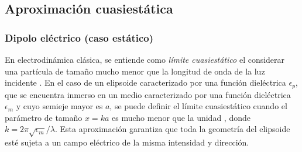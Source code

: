 \subsection{Aproximación cuasiestática}
\subsubsection{Dipolo eléctrico (caso estático)}

En electrodinámica clásica, se entiende como \textit{límite cuasiestático} el considerar una partícula de tamaño mucho menor que la longitud de onda de la luz incidente \cite{Cuasiest}. En el caso de un elipsoide caracterizado por una función dieléctrica $\epsilon_p$, que se encuentra inmerso en un medio caracterizado por una función dieléctrica $\epsilon_m$ y cuyo semieje mayor es $a$, se puede definir el límite cuasiestático cuando el parámetro de tamaño $x=ka$ es mucho menor que la unidad \cite{Bohren}, donde $k=2\pi \sqrt{\epsilon_m}/\lambda$. Esta aproximación garantiza que toda la geometría del elipsoide esté sujeta a un campo eléctrico de la misma intensidad y dirección. \cite{Miguel}\\


